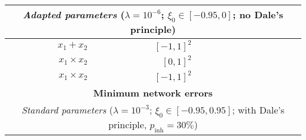 \begin{table}
\begin{tabular}{r r r r r r r }
\\

\midrule

\multicolumn{7}{c}{\textit{Adapted parameters} ($\lambda = 10^{-6}$; $\xi_0 \in [-0.95, 0]$; no Dale's principle)} \\

\midrule

$x_1 + x_2$

& $[-1, 1]^2$

& \cellcolor{White!100!SteelBlue}{$\mathbf{3.4 \pm 0.4 \%}$}

& \cellcolor{White!40!SteelBlue}{$3.5 \pm 0.3 \%$}

& \cellcolor{White!20!SteelBlue}{$3.9 \pm 0.4 \%$}

& \cellcolor{White!100!SteelBlue}{$\mathbf{3.4 \pm 0.4 \%}$}

& \cellcolor{White!100!SteelBlue}{$\mathbf{3.4 \pm 0.4 \%}$}

\\

$x_1 \times x_2$

& $[0, 1]^2$

& \cellcolor{White!20!SteelBlue}{$20.4 \pm 0.9 \%$}

& \cellcolor{White!100!SteelBlue}{$\mathbf{4.7 \pm 0.7 \%}$}

& \cellcolor{White!40!SteelBlue}{$5.4 \pm 0.6 \%$}

& \cellcolor{White!80!SteelBlue}{$5.0 \pm 0.7 \%$}

& \cellcolor{White!80!SteelBlue}{$5.0 \pm 0.7 \%$}

\\

$x_1 \times x_2$

& $[-1, 1]^2$

& \cellcolor{White!20!SteelBlue}{$109.7 \pm 2.6 \%$}

& \cellcolor{White!100!SteelBlue}{$\mathbf{6.5 \pm 0.3 \%}$}

& \cellcolor{White!40!SteelBlue}{$71.6 \pm 4.9 \%$}

& \cellcolor{White!60!SteelBlue}{$26.1 \pm 5.0 \%$}

& \cellcolor{White!80!SteelBlue}{$24.1 \pm 4.0 \%$}

\\

\midrule
\multicolumn{7}{c}{\textbf{Minimum network errors}}\\
\multicolumn{7}{c}{\textit{Standard parameters} ($\lambda = 10^{-3}$; $\xi_0 \in [-0.95, 0.95]$; with Dale's principle, $p_\mathrm{inh} = 30\%$)} \\


\end{tabular}
\end{table}

